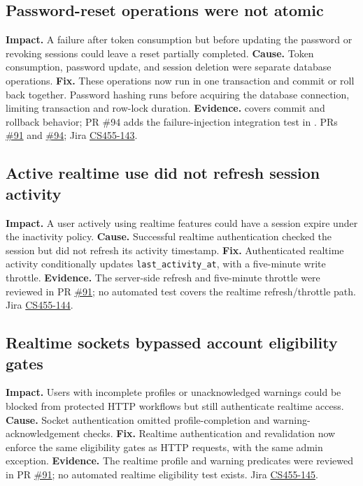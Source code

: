 \documentclass[10pt]{article}
\begin{document}
\subsection{Password-reset operations were not atomic}
\textbf{Impact.} A failure after token consumption but before updating the password or revoking sessions could leave a reset partially completed.
\textbf{Cause.} Token consumption, password update, and session deletion were separate database operations.
\textbf{Fix.} These operations now run in one transaction and commit or roll back together. Password hashing runs before acquiring the database connection, limiting transaction and row-lock duration.
\textbf{Evidence.}  covers commit and rollback behavior; PR \#94 adds the failure-injection integration test in . PRs \href{https://github.com/CS455-Carpooling/Campus_Ridepooling_Automation/pull/91}{\#91} and \href{https://github.com/CS455-Carpooling/Campus_Ridepooling_Automation/pull/94}{\#94}; Jira \href{https://cs455project.atlassian.net/browse/CS455-143}{CS455-143}.
\subsection{Active realtime use did not refresh session activity}
\textbf{Impact.} A user actively using realtime features could have a session expire under the inactivity policy.
\textbf{Cause.} Successful realtime authentication checked the session but did not refresh its activity timestamp.
\textbf{Fix.} Authenticated realtime activity conditionally updates \texttt{last\_activity\_at}, with a five-minute write throttle.
\textbf{Evidence.} The server-side refresh and five-minute throttle were reviewed in PR \href{https://github.com/CS455-Carpooling/Campus_Ridepooling_Automation/pull/91}{\#91}; no automated test covers the realtime refresh/throttle path. Jira \href{https://cs455project.atlassian.net/browse/CS455-144}{CS455-144}.
\subsection{Realtime sockets bypassed account eligibility gates}
\textbf{Impact.} Users with incomplete profiles or unacknowledged warnings could be blocked from protected HTTP workflows but still authenticate realtime access.
\textbf{Cause.} Socket authentication omitted profile-completion and warning-acknowledgement checks.
\textbf{Fix.} Realtime authentication and revalidation now enforce the same eligibility gates as HTTP requests, with the same admin exception.
\textbf{Evidence.} The realtime profile and warning predicates were reviewed in PR \href{https://github.com/CS455-Carpooling/Campus_Ridepooling_Automation/pull/91}{\#91}; no automated realtime eligibility test exists. Jira \href{https://cs455project.atlassian.net/browse/CS455-145}{CS455-145}.
\end{document}
